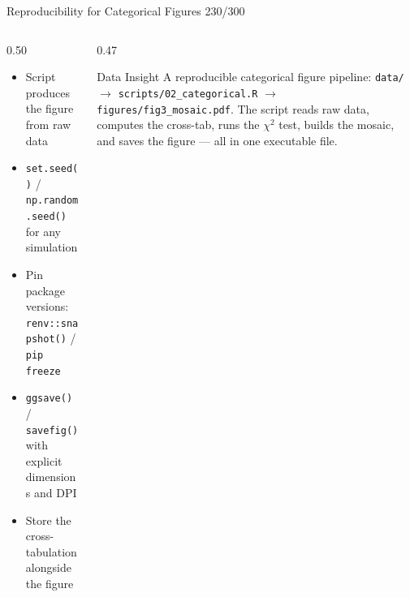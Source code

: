 \documentclass[10pt]{beamer}
\newcommand{\smark}[1]{\hfill{\scriptsize\color{codegray}#1}}
\begin{document}
\begin{frame}{Reproducibility for Categorical Figures}
\smark{230/300}
\begin{columns}[T]
\begin{column}{0.50\textwidth}
\begin{itemize}
    \item Script produces the figure from raw data
    \item \texttt{set.seed()} / \texttt{np.random.seed()} for any simulation
    \item Pin package versions: \texttt{renv::snapshot()} / \texttt{pip freeze}
    \item \texttt{ggsave()} / \texttt{savefig()} with explicit dimensions and DPI
    \item Store the cross-tabulation alongside the figure
\end{itemize}
\end{column}
\begin{column}{0.47\textwidth}
\begin{exampleblock}{Data Insight}
    \scriptsize A reproducible categorical figure pipeline: \texttt{data/} $\to$ \texttt{scripts/02\_categorical.R} $\to$ \texttt{figures/fig3\_mosaic.pdf}. The script reads raw data, computes the cross-tab, runs the $\chi^2$ test, builds the mosaic, and saves the figure --- all in one executable file.
\end{exampleblock}
\end{column}
\end{columns}
\end{frame}
\end{document}
